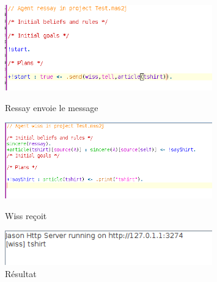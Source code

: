 \begin{figure}[H]
	\centering
	\includegraphics[width=0.8\textwidth]{imgs/jasonRessay.png}
	\caption{Ressay envoie le message}
	\includegraphics[width=0.8\textwidth]{imgs/wissRecievedRessay.png}
	\caption{Wiss reçoit}
	\includegraphics[width=0.8\textwidth]{imgs/wissRessayDone.png}
	\caption{Résultat}
	
\end{figure}
